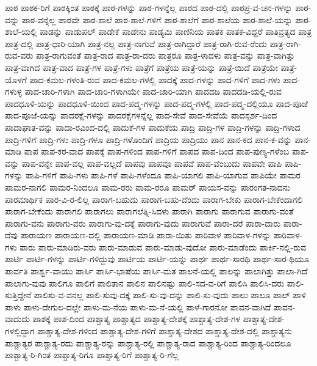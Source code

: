{ಪಾಠ
ಪಾಠಕ-ರಿಗೆ
ಪಾಠಕ್ಕಿಂತ
ಪಾಠಕ್ಕೆ
ಪಾಠ-ಗಳನ್ನು
ಪಾಠ-ಗಳನ್ನೆಲ್ಲ
ಪಾಠದ
ಪಾಠ-ದಲ್ಲಿ
ಪಾಠಪ್ರ-ವ-ಚನ-ಗಳನ್ನು
ಪಾಠ-ವನ್ನು
ಪಾಠ-ವನ್ನೆಲ್ಲ
ಪಾಠವೇ
ಪಾಠ-ಶಾಲೆ
ಪಾಠ-ಶಾಲೆ-ಗಳಿಗೆ
ಪಾಠ-ಶಾಲೆಗೆ
ಪಾಠ-ಶಾಲೆಯ
ಪಾಠ-ಶಾಲೆ-ಯನ್ನು
ಪಾಠ-ಶಾಲೆ-ಯಲ್ಲಿ
ಪಾಡನ್ನು
ಪಾಡುಪಲ್
ಪಾಡೇಕೆ
ಪಾಡೇನು
ಪಾಡ್ಯಮಿ
ಪಾಣಿನಿಯ
ಪಾತಕ
ಪಾತಕ-ವಿದ್ದರೆ
ಪಾತಿವ್ರತ್ಯದ
ಪಾತ್ರ
ಪಾತ್ರ-ದಲ್ಲಿ
ಪಾತ್ರ-ಧಾರಿ-ಯಾಗಿ
ಪಾತ್ರ-ನಲ್ಲ
ಪಾತ್ರ-ನಾಗುವೆ
ಪಾತ್ರ-ರಾಗಿದ್ದಾರೆ
ಪಾತ್ರ-ರಾಗಿ-ರುವ-ರೆಂದು
ಪಾತ್ರ-ರಾಗಿ-ರುವ-ವರು
ಪಾತ್ರ-ರಾಗುವಂತೆ
ಪಾತ್ರ-ರಾದ
ಪಾತ್ರ-ರಾ-ದರು
ಪಾತ್ರರೂ
ಪಾತ್ರ-ಳಾದಳು
ಪಾತ್ರ-ವನ್ನು
ಪಾತ್ರ-ವಾಗಿತ್ತು
ಪಾತ್ರ-ವಾಗಿದೆ
ಪಾತ್ರ-ವಾದ
ಪಾತ್ರೆ-ಗಳ
ಪಾತ್ರೆ-ಗಳು
ಪಾತ್ರೆಗೆ
ಪಾತ್ರೆಯ
ಪಾತ್ರೆ-ಯನ್ನು
ಪಾತ್ರೆ-ಯಿದೆ
ಪಾತ್ರೆಯೇ
ಪಾತ್ರೆ-ಯೊಳಗೆ
ಪಾದ-ಕಮಲ-ಗಳಂತಿ-ರುವ
ಪಾದ-ಕಮಲ-ಗಳಲ್ಲಿ
ಪಾದಕ್ಕೆ
ಪಾದ-ಗಳನ್ನು
ಪಾದ-ಗಳಿಗೆ
ಪಾದ-ಗಳು
ಪಾದ-ಗಳುಳ್ಳ
ಪಾದ-ಚಾರಿ-ಗಳಾಗಿ
ಪಾದ-ಚಾರಿ-ಗಳಾಗಿಯೇ
ಪಾದ-ಚಾರಿ-ಯಾಗಿ
ಪಾದದಡಿ
ಪಾದದಡಿ-ಯಲ್ಲಿ-ರುವ
ಪಾದಧೂಳಿ-ಯನ್ನು
ಪಾದಧೂಳಿ-ಯಿಂದ
ಪಾದ-ಪದ್ಮ-ಗಳನ್ನು
ಪಾದ-ಪದ್ಮ-ಗಳಲ್ಲಿ
ಪಾದ-ಪದ್ಮ-ದಲ್ಲಿಯೂ
ಪಾದ-ಪೂಜೆ
ಪಾದ-ಪೂಜೆ-ಯನ್ನು
ಪಾದರಕ್ಷೆ-ಗಳನ್ನು
ಪಾದರಕ್ಷೆಗಳನ್ನೆಲ್ಲ
ಪಾದ-ಸೇವೆ
ಪಾದ-ಸೇವೆಯೆ
ಪಾದಸ್ಪರ್ಶ-ದಿಂದ
ಪಾದಾಘಾತ-ವನ್ನು
ಪಾದಾ-ರವಿಂದ-ದಲ್ಲಿ
ಪಾದುಕೆ-ಗಳ
ಪಾದುಕೆಯ
ಪಾದ್ರಿ
ಪಾದ್ರಿ-ಗಳ
ಪಾದ್ರಿ-ಗಳನ್ನು
ಪಾದ್ರಿ-ಗಳಾದ
ಪಾದ್ರಿ-ಗಳಿಗೆ
ಪಾದ್ರಿ-ಗಳು
ಪಾದ್ರಿ-ಗಳೂ
ಪಾದ್ರಿ-ಗಳೊಂದಿಗೆ
ಪಾದ್ರಿಯ
ಪಾದ್ರಿಯು
ಪಾನ
ಪಾನ-ಕದ
ಪಾನ-ಕ-ವನ್ನು
ಪಾನ-ಮಾಡಿ
ಪಾಪ
ಪಾಪ-ಕರ-ವಾದ
ಪಾಪಕ್ಕೆ
ಪಾಪ-ಗಳಿಂದ
ಪಾಪ-ಗಳಿಗೆ
ಪಾಪದ
ಪಾಪ-ದಿಂದ
ಪಾಪ-ಪುಣ್ಯ-ಗಳೆಂಬ
ಪಾಪ-ವನ್ನು
ಪಾಪ-ವನ್ನೇ
ಪಾಪ-ವಲ್ಲ
ಪಾಪ-ವಲ್ಲದೆ
ಪಾಪವು
ಪಾಪವೂ
ಪಾಪವೆ
ಪಾಪ-ವೆಂಬುದು
ಪಾಪವೇ
ಪಾಪಿ
ಪಾಪಿ-ಗಳನ್ನು
ಪಾಪಿ-ಗಳಿಗೆ
ಪಾಪಿ-ಗಳು
ಪಾಪಿ-ಗಳೆ
ಪಾಪಿ-ಗಳೆಂದೂ
ಪಾಪಿ-ಯಾಗಲಿ
ಪಾಪಿ-ಯಾಗುವ
ಪಾಪಿಯೇ
ಪಾಮರ
ಪಾಮರ-ನಾಗಲಿ
ಪಾಮರ-ನಿಂದಲೂ
ಪಾಮ-ರರು
ಪಾಮ-ರರೂ
ಪಾಮರ್
ಪಾಯಸ-ವನ್ನು
ಪಾರಂಗತ-ನಾದನು
ಪಾರಮಾರ್ಥಿಕ
ಪಾರ-ವಿ-ರ-ಲಿಲ್ಲ
ಪಾರಾಗ-ಬಹುದು
ಪಾರಾಗ-ಬಹು-ದೆಂದು
ಪಾರಾಗ-ಬೇಕು
ಪಾರಾಗ-ಬೇಕೆಂದಾಗಲಿ
ಪಾರಾಗ-ಬೇಕೆಂದು
ಪಾರಾಗಲಿ
ಪಾರಾಗಲು
ಪಾರಾಗಲೆತ್ನಿ-ಸಿದಳು
ಪಾರಾಗಿ
ಪಾರಾಗು
ಪಾರಾಗುವ
ಪಾರಾಗು-ವಂತೆ
ಪಾರಾಗು-ವನು
ಪಾರಾಗು-ವರು
ಪಾರಾಗು-ವು-ದಕ್ಕೆ
ಪಾರಾಗು-ವುದು
ಪಾರಾಗುವೆ
ಪಾರಾ-ದರೆ
ಪಾರಾ-ದಾರು
ಪಾರಾ-ದೆವು
ಪಾರಾಯಣ
ಪಾರಾಯಣ-ದಲ್ಲಿ
ಪಾರಾಯಣ-ಮಾಡಿ
ಪಾರಾ-ಯಿತು
ಪಾರಿವಾಳ
ಪಾರಿವಾಳ-ಗಳನ್ನು
ಪಾರಿವಾಳ-ಗಳು
ಪಾರು
ಪಾರು-ಮಾಡಿರು-ವರು
ಪಾರು-ಮಾಡುವ
ಪಾರು-ಮಾಡು-ವುದೋ
ಪಾರು-ಮಾಡೆಂದು
ಪಾರ್ಕಿ-ನಲ್ಲಿ-ರುವ
ಪಾರ್ಟಿ
ಪಾರ್ಟಿ-ಗಳನ್ನು
ಪಾರ್ಟಿ-ಗಳಿದ್ದುವು
ಪಾರ್ಟಿಯ
ಪಾರ್ಟಿ-ಯನ್ನು
ಪಾರ್ಥ
ಪಾರ್ಥ-ಸಾರಥಿ
ಪಾರ್ಥ-ಸಾರ-ಥಿಯೂ
ಪಾರ್ವತಿ
ಪಾರ್ಶ್ವ-ವಾಯು
ಪಾರ್ಸಿ
ಪಾರ್ಸಿ-ಭಾಷೆಯ
ಪಾರ್ಸಿ-ಮತ
ಪಾಲನೆ-ಯಲ್ಲಿ
ಪಾಲನ್ನು
ಪಾಲಾಗಿತ್ತು
ಪಾಲಾ-ಗಿದೆ
ಪಾಲಾಗು-ವುವು
ಪಾಲಿಗೂ
ಪಾಲಿಗೆ
ಪಾಲಿತಾನ
ಪಾಲಿನ
ಪಾಲಿನಷ್ಟು
ಪಾಲಿ-ಸದ-ವ-ರಿಗೆ
ಪಾಲಿಸಿ
ಪಾಲಿಸಿ-ದರು
ಪಾಲಿ-ಸುತ್ತಿದ್ದೇನೆ
ಪಾಲಿಸು-ವ-ವನಲ್ಲ
ಪಾಲಿ-ಸುವು-ದಕ್ಕೆ
ಪಾಲಿ-ಸು-ವು-ದನ್ನು
ಪಾಲಿ-ಸು-ವುದು
ಪಾಲು
ಪಾಲೂ
ಪಾಲ್
ಪಾಳಿ
ಪಾಳು
ಪಾಳು-ದೇಗುಲ-ದಲ್ಲೇ
ಪಾಳು-ಮ-ನೆಯ
ಪಾಳು-ಮ-ನೆ-ಯಲ್ಲಿ
ಪಾಳೆ-ಗಾರನೋ
ಪಾವನ-ವಾಗಿದೆ
ಪಾವನ-ವಾದುದು
ಪಾಶಕ್ಕೆ
ಪಾಶ-ದಿಂದ
ಪಾಶ್ಚಾತ್ಯ
ಪಾಶ್ಚಾತ್ಯದ
ಪಾಶ್ಚಾತ್ಯ-ದೇಶಕ್ಕೆ
ಪಾಶ್ಚಾತ್ಯ-ದೇಶ-ಗಳ
ಪಾಶ್ಚಾತ್ಯ-ದೇಶ-ಗಳಲ್ಲಿದ್ದಾಗ
ಪಾಶ್ಚಾತ್ಯ-ದೇಶ-ಗಳಿಂದ
ಪಾಶ್ಚಾತ್ಯ-ದೇಶ-ಗಳಿಗೆ
ಪಾಶ್ಚಾತ್ಯ-ದೇಶದ
ಪಾಶ್ಚಾತ್ಯ-ದೇಶ-ದಲ್ಲಿ
ಪಾಶ್ಚಾತ್ಯನು
ಪಾಶ್ಚಾತ್ಯರ
ಪಾಶ್ಚಾತ್ಯ-ರದು
ಪಾಶ್ಚಾತ್ಯ-ರನ್ನು
ಪಾಶ್ಚಾತ್ಯ-ರಲ್ಲಿ
ಪಾಶ್ಚಾತ್ಯ-ರಾದ
ಪಾಶ್ಚಾತ್ಯ-ರಿಂದ
ಪಾಶ್ಚಾತ್ಯ-ರಿಂದಲೂ
ಪಾಶ್ಚಾತ್ಯ-ರಿ-ಗಿಂತ
ಪಾಶ್ಚಾತ್ಯ-ರಿಗೂ
ಪಾಶ್ಚಾತ್ಯ-ರಿಗೆ
ಪಾಶ್ಚಾತ್ಯ-ರಿ-ಗೆಲ್ಲ
}
